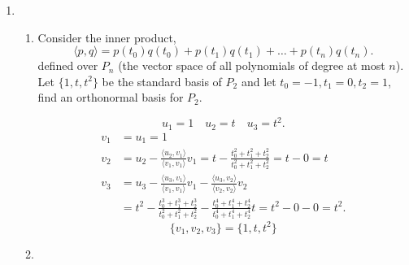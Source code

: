 \documentclass{zc-ust-hw}
\begin{document}
\begin{enumerate}
    \newpage

  \item \begin{enumerate}
      
      \item Consider the inner product, \[
        \langle p,q \rangle = p(t_{0})q(t_{0})+ p(t_{1})q(t_{1}) + \ldots + p(t_{n})q(t_{n})
      .\] defined over \(P_{n}\) (the vector space of all polynomials of degree
      at most \(n\)). Let  \(\{1,t,t^2\}\)  be the standard basis of \(P_{2}\)
      and let \( t_{0}=-1,t_{1}=0,t_{2}=1 \), find an orthonormal basis for \(P_{2}\).
      \begin{sol}
        \begin{equation}
          u_{1} = 1 \quad u_{2} = t \quad u_{3} = t^2
        .\end{equation}
        \begin{align}
          v_{1} &= u_{1} = 1 \\
          v_{2} &= u_{2} - \frac{\langle u_{2}, v_{1} \rangle}{\langle v_{1}, v_{1} \rangle}v_{1} = t - \frac{t_{0}^2 + t_{1}^2 + t_{2}^2}{t_{0}^2 + t_{1}^2 + t_{2}^2} = t - 0 = t \\
          v_{3} &= u_{3} - \frac{\langle u_{3}, v_{1} \rangle}{\langle v_{1}, v_{1} \rangle}v_{1} - \frac{\langle u_{3}, v_{2} \rangle}{\langle v_{2}, v_{2} \rangle}v_{2} \\
                &= t^2 - \frac{t_{0}^3 + t_{1}^3 + t_{2}^3}{t_{0}^2 + t_{1}^2 + t_{2}^2} - \frac{t_{0}^4 + t_{1}^4 + t_{2}^4}{t_{0}^4 + t_{1}^4 + t_{2}^4}t = t^2 - 0 - 0 = t^2
        .\end{align}
        \begin{equation}
          \{v_{1}, v_{2}, v_{3}\} = \{1, t, t^2\}
        \end{equation}
      \end{sol}

    \item 
    \end{enumerate}
  
\end{enumerate}
\end{document}
